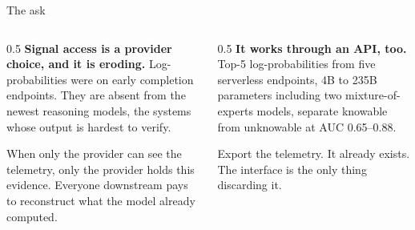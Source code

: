 \documentclass[aspectratio=169,10pt]{beamer}
\begin{document}
\begin{frame}{The ask}
  \begin{columns}[T]
    \begin{column}{0.5\textwidth}
      \textbf{Signal access is a provider choice, and it is eroding.}
      Log-probabilities were on early completion endpoints. They are absent
      from the newest reasoning models, the systems whose output is hardest
      to verify.

      \vspace{0.5em}
      When only the provider can see the telemetry, only the provider holds
      this evidence. Everyone downstream pays to reconstruct what the model
      already computed.
    \end{column}
    \begin{column}{0.5\textwidth}
      \textbf{It works through an API, too.} Top-5 log-probabilities from
      five serverless endpoints, 4B to 235B parameters including two
      mixture-of-experts models, separate knowable from unknowable at AUC
      0.65--0.88.

      \vspace{0.5em}
      \begin{block}{}
        Export the telemetry. It already exists. The interface is the only
        thing discarding it.
      \end{block}
    \end{column}
  \end{columns}
\end{frame}
\end{document}
